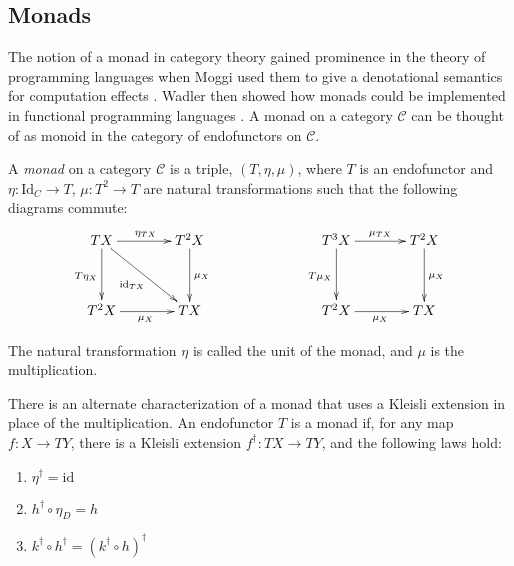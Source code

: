 
%


\subsection{Monads}

The notion of a monad in category theory gained prominence in the theory of programming languages when Moggi used them to give a denotational semantics for computation effects \cite{moggi1991notions}.  Wadler then showed how monads could be implemented in functional programming languages \cite{wadler1992essence}.
A monad on a category $\mathcal{C}$ can be thought of as monoid in the category of endofunctors on $\mathcal{C}$.  

\begin{definition}
A \emph{monad} on a category $\mathcal{C}$ is a triple, $(T, \eta, \mu)$, where $T$ is an endofunctor and $\eta:\mathrm{Id}_C\rightarrow T$,
$\mu:T^2\rightarrow T$ are natural transformations such that the following diagrams commute:
\[
\xymatrix@+1pc{
TX\ar[r]^{\eta_{TX}}\ar[d]_{T\eta_X}\ar[dr]_{\mathrm{id}_{TX}} & T^2 X\ar[d]^{\mu_X} & & 
T^3 X\ar[r]^{\mu_{TX}}\ar[d]_{T\mu_X} & T^2 X\ar[d]^{\mu_X} \\
T^2 X\ar[r]_{\mu_X} & TX & & T^2 X\ar[r]_{\mu_X} & TX
}
\]
\end{definition}
\noindent The natural transformation $\eta$ is called the unit of the monad, and $\mu$ is the multiplication.

There is an alternate characterization of a monad that uses a Kleisli extension in place of the multiplication.  An endofunctor $T$ is a monad if, for any map $f:X\rightarrow TY$, there is a Kleisli extension $f^\dagger:TX\rightarrow TY$, and the following laws hold:

\begin{enumerate}
	\item $\eta^\dagger = \mathrm{id}$
	\item $h^\dagger \circ \eta_D = h$
	\item $k^\dagger \circ h^\dagger = (k^\dagger \circ h)^\dagger$
\end{enumerate}


